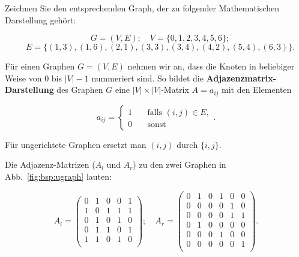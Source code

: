 \begin{aufg}
Zeichnen Sie den entsprechenden Graph, der zu folgender Mathematischen Darstellung gehört:

\[ \quad G = (V, E); \quad V = \{0,1,2,3,4,5,6\}; \] 
\[\quad E =  \{ (1,3),(1,6), (2,1), (3,3), (3,4), (4,2), (5,4), (6,3)\}. \]

\end{aufg}


\begin{mdef}
Für einen Graphen $G=(V,E)$ nehmen wir an, dass die Knoten in beliebiger Weise von 0 bis $|V|-1$ nummeriert sind.
So bildet die \textbf{Adjazenzmatrix-Darstellung} des Graphen $G$ eine $|V| \times |V|$-Matrix $A=a_{ij}$ mit den Elementen

\[ a_{ij} = 
  \begin{cases}
    1   & \quad \text{falls } (i,j) \in E, \\
   0   & \quad \text{sonst}
  \end{cases}.
\]

Für ungerichtete Graphen ersetzt man $(i,j) \text{ durch } \{i,j\}$.
\end{mdef}

\begin{mbsp}
Die Adjazenz-Matrizen ($A_l$ und $A_r$) zu den zwei Graphen in Abb.~\ref{fig:bsp:ugraph} lauten:

\[ A_l =  \begin{pmatrix}
  0 & 1 & 0 & 0 & 1 \\
  1 & 0 & 1 & 1 & 1 \\
  0 & 1 & 0 & 1 & 0  \\
  0 & 1 & 1 & 0 & 1 \\
  1 & 1 & 0 & 1 & 0 \\
 \end{pmatrix};
\quad
A_r =  \begin{pmatrix}
  0 & 1 & 0 & 1 & 0 & 0 \\
  0 & 0 & 0 & 0 & 1 & 0 \\
  0 & 0 & 0 & 0 & 1 & 1 \\
  0 & 1 & 0 & 0 & 0 & 0 \\
  0 & 0 & 0 & 1 & 0 & 0 \\
  0 & 0 & 0 & 0 & 0 & 1 \\
 \end{pmatrix}.
  \]
\end{mbsp}

